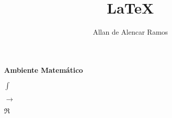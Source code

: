 \documentclass[12pt, a4paper]{article}
\begin{document}
\title{LaTeX}
\author{Allan de Alencar Ramos}
\maketitle

\begin{center}
\large\textbf{Ambiente Matemático}
\end{center}
\vspace{0.5cm}

$ \int $

$ \longrightarrow $

$ \Re $
\end{document}
